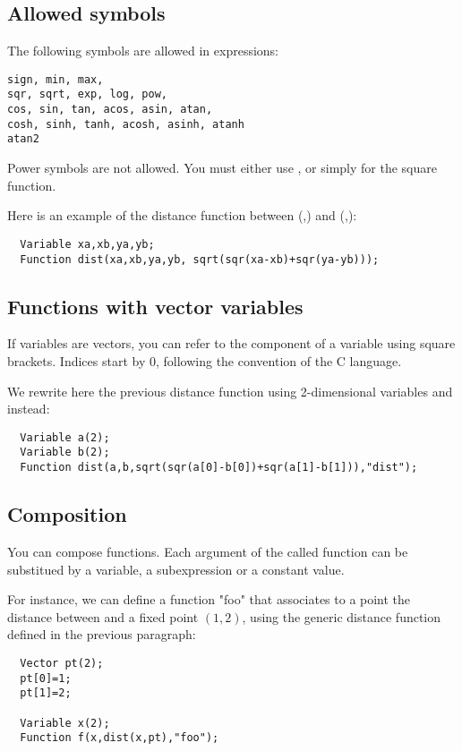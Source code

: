 \subsection{Allowed symbols}

The following symbols are allowed in expressions:
\begin{verbatim}
sign, min, max,
sqr, sqrt, exp, log, pow, 
cos, sin, tan, acos, asin, atan,
cosh, sinh, tanh, acosh, asinh, atanh
atan2
\end{verbatim}

Power symbols \cf{^} are not allowed. You must
either use , or simply  for the square function.

Here is an example of the distance function between (,) and
(,):

\begin{lstlisting}
  Variable xa,xb,ya,yb;
  Function dist(xa,xb,ya,yb, sqrt(sqr(xa-xb)+sqr(ya-yb)));
\end{lstlisting}

\subsection{Functions with vector variables}

If variables are vectors, you can refer to the component
of a variable using square brackets. Indices start by 0,
following the convention of the C language.

We rewrite here the previous distance function using 2-dimensional
variables  and  instead:
\begin{lstlisting}
  Variable a(2);
  Variable b(2);
  Function dist(a,b,sqrt(sqr(a[0]-b[0])+sqr(a[1]-b[1])),"dist");
\end{lstlisting}

\subsection{Composition}

You can compose functions. Each argument of the called function can be substitued
by a variable, a subexpression or a constant value.

For instance, we can define a function "foo" that associates to
a point  the distance between  and a fixed point $(1,2)$,
using the generic distance function defined in the previous paragraph:

\begin{lstlisting}
  Vector pt(2);
  pt[0]=1;
  pt[1]=2;

  Variable x(2);
  Function f(x,dist(x,pt),"foo");
\end{lstlisting}

